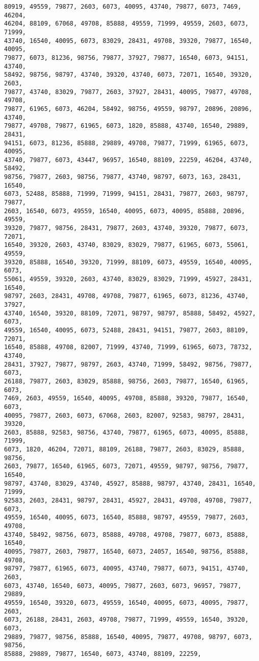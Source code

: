 \documentclass{article}
\begin{document}
\begin{lstlisting}[caption=(msg.txt)-dec.txt]
80919, 49559, 79877, 2603, 6073, 40095, 43740, 79877, 6073, 7469, 46204,
46204, 88109, 67068, 49708, 85888, 49559, 71999, 49559, 2603, 6073, 71999,
43740, 16540, 40095, 6073, 83029, 28431, 49708, 39320, 79877, 16540, 40095,
79877, 6073, 81236, 98756, 79877, 37927, 79877, 16540, 6073, 94151, 43740,
58492, 98756, 98797, 43740, 39320, 43740, 6073, 72071, 16540, 39320, 2603,
79877, 43740, 83029, 79877, 2603, 37927, 28431, 40095, 79877, 49708, 49708,
79877, 61965, 6073, 46204, 58492, 98756, 49559, 98797, 20896, 20896, 43740,
79877, 49708, 79877, 61965, 6073, 1820, 85888, 43740, 16540, 29889, 28431,
94151, 6073, 81236, 85888, 29889, 49708, 79877, 71999, 61965, 6073, 40095,
43740, 79877, 6073, 43447, 96957, 16540, 88109, 22259, 46204, 43740, 58492,
98756, 79877, 2603, 98756, 79877, 43740, 98797, 6073, 163, 28431, 16540,
6073, 52488, 85888, 71999, 71999, 94151, 28431, 79877, 2603, 98797, 79877,
2603, 16540, 6073, 49559, 16540, 40095, 6073, 40095, 85888, 20896, 49559,
39320, 79877, 98756, 28431, 79877, 2603, 43740, 39320, 79877, 6073, 72071,
16540, 39320, 2603, 43740, 83029, 83029, 79877, 61965, 6073, 55061, 49559,
39320, 85888, 16540, 39320, 71999, 88109, 6073, 49559, 16540, 40095, 6073,
55061, 49559, 39320, 2603, 43740, 83029, 83029, 71999, 45927, 28431, 16540,
98797, 2603, 28431, 49708, 49708, 79877, 61965, 6073, 81236, 43740, 37927,
43740, 16540, 39320, 88109, 72071, 98797, 98797, 85888, 58492, 45927, 6073,
49559, 16540, 40095, 6073, 52488, 28431, 94151, 79877, 2603, 88109, 72071,
16540, 85888, 49708, 82007, 71999, 43740, 71999, 61965, 6073, 78732, 43740,
28431, 37927, 79877, 98797, 2603, 43740, 71999, 58492, 98756, 79877, 6073,
26188, 79877, 2603, 83029, 85888, 98756, 2603, 79877, 16540, 61965, 6073,
7469, 2603, 49559, 16540, 40095, 49708, 85888, 39320, 79877, 16540, 6073,
40095, 79877, 2603, 6073, 67068, 2603, 82007, 92583, 98797, 28431, 39320,
2603, 85888, 92583, 98756, 43740, 79877, 61965, 6073, 40095, 85888, 71999,
6073, 1820, 46204, 72071, 88109, 26188, 79877, 2603, 83029, 85888, 98756,
2603, 79877, 16540, 61965, 6073, 72071, 49559, 98797, 98756, 79877, 16540,
98797, 43740, 83029, 43740, 45927, 85888, 98797, 43740, 28431, 16540, 71999,
92583, 2603, 28431, 98797, 28431, 45927, 28431, 49708, 49708, 79877, 6073,
49559, 16540, 40095, 6073, 16540, 85888, 98797, 49559, 79877, 2603, 49708,
43740, 58492, 98756, 6073, 85888, 49708, 49708, 79877, 6073, 85888, 16540,
40095, 79877, 2603, 79877, 16540, 6073, 24057, 16540, 98756, 85888, 49708,
98797, 79877, 61965, 6073, 40095, 43740, 79877, 6073, 94151, 43740, 2603,
6073, 43740, 16540, 6073, 40095, 79877, 2603, 6073, 96957, 79877, 29889,
49559, 16540, 39320, 6073, 49559, 16540, 40095, 6073, 40095, 79877, 2603,
6073, 26188, 28431, 2603, 49708, 79877, 71999, 49559, 16540, 39320, 6073,
29889, 79877, 98756, 85888, 16540, 40095, 79877, 49708, 98797, 6073, 98756,
85888, 29889, 79877, 16540, 6073, 43740, 88109, 22259, 
\end{lstlisting}
\newpage
\end{document}
